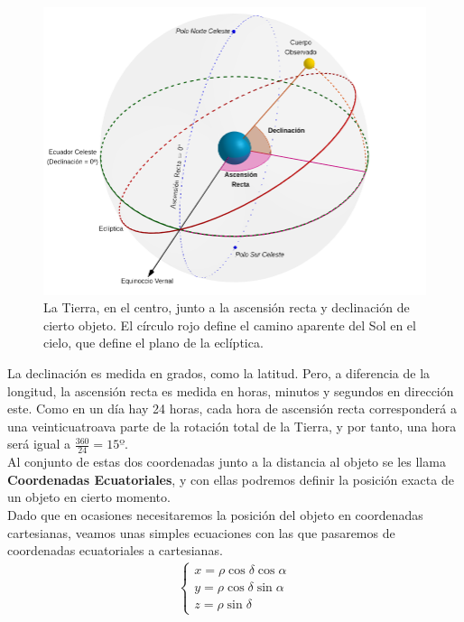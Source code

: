 \begin{figure}[H]
\centering
\includegraphics[scale=0.4]{images/ascension_declinacion.png}
\caption{La Tierra, en el centro, junto a la ascensión recta y declinación de cierto objeto. El círculo rojo define el camino aparente del Sol en el cielo, que define el plano de la eclíptica.}
\label{fig:ascension_declinacion}
\end{figure}

La declinación es medida en grados, como la latitud. Pero, a diferencia de la longitud, la ascensión recta es medida en horas, minutos y segundos en dirección este. Como en un día hay 24 horas, cada hora de ascensión recta corresponderá a una veinticuatroava parte de la rotación total de la Tierra, y por tanto, una hora será igual a $\frac{360}{24}=15º$.\\

Al conjunto de estas dos coordenadas junto a la distancia al objeto se les llama \textbf{Coordenadas Ecuatoriales}, y con ellas podremos definir la posición exacta de un objeto en cierto momento.\\

Dado que en ocasiones necesitaremos la posición del objeto en coordenadas cartesianas, veamos unas simples ecuaciones con las que pasaremos de coordenadas ecuatoriales a cartesianas.
\begin{align}
\left\{
\begin{array}{l}
	x = \rho \cos{\delta}\cos{\alpha}\\
	y = \rho \cos{\delta}\sin{\alpha}\\
	z = \rho \sin{\delta}
\end{array}
\right.
\label{eq:equatorial_to_cartesian}
\end{align}

